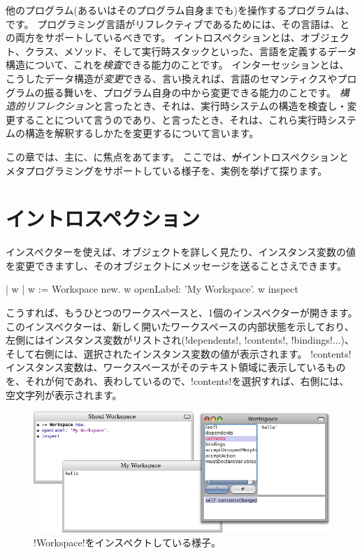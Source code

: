 \documentclass[a4paper,10pt,twoside]{book}
\begin{document}
他のプログラム(あるいはそのプログラム自身までも)を操作するプログラムは、です。
プログラミング言語がリフレクティブであるためには、その言語は、との両方をサポートしているべきです。
イントロスペクションとは、オブジェクト、クラス、メソッド、そして実行時スタックといった、言語を定義するデータ構造について、これを\emph{検査}できる能力のことです。
インターセッションとは、こうしたデータ構造が\emph{変更}できる、言い換えれば、言語のセマンティクスやプログラムの振る舞いを、プログラム自身の中から変更できる能力のことです。
\emph{構造的リフレクション}と言ったとき、それは、実行時システムの構造を検査し・変更することについて言うのであり、と言ったとき、それは、これら実行時システムの構造を解釈するしかたを変更するについて言います。

この章では、主に、に焦点をあてます。
ここでは、\st がイントロスペクションとメタプログラミングをサポートしている様子を、実例を挙げて探ります。

\section{イントロスペクション}

インスペクターを使えば、オブジェクトを詳しく見たり、インスタンス変数の値を変更できますし、そのオブジェクトにメッセージを送ることさえできます。

\begin{code}{| w |}
w := Workspace new.
w openLabel: 'My Workspace'.
w inspect
\end{code}

こうすれば、もうひとつのワークスペースと、1個のインスペクターが開きます。
このインスペクターは、新しく開いたワークスペースの内部状態を示しており、左側にはインスタンス変数がリストされ(\ct!dependents!, \ct!contents!, \ct!bindings!...)、そして右側には、選択されたインスタンス変数の値が表示されます。
\ct!contents!インスタンス変数は、ワークスペースがそのテキスト領域に表示しているものを、それが何であれ、表わしているので、\ct!contents!を選択すれば、右側には、空文字列が表示されます。

\begin{figure}[ht]\centering
	\includegraphics[width=\linewidth]{workspaceInspector}
	\caption{\ct!Workspace!をインスペクトしている様子。}
\end{figure}
\end{document}
